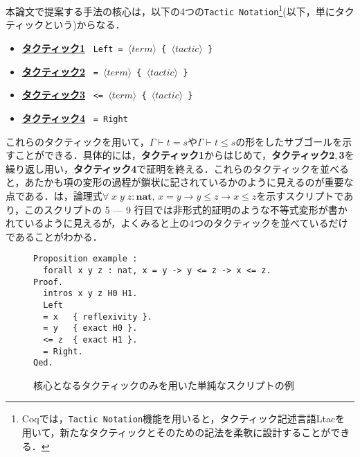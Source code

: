 \documentclass[submit]{ipsj}
\begin{document}
本論文で提案する手法の核心は，以下の4つの\verb+Tactic Notation+\footnote{Coqでは，\texttt{Tactic Notation}機能を用いると，タクティック記述言語Ltacを用いて，新たなタクティックとそのための記法を柔軟に設計することができる．}(以下，単にタクティックという)からなる．
\begin{itemize}
\item \underline{\gtfamily\bfseries タクティック1} ~\verb+Left = +$\langle\mathit{term}\rangle$\verb+ { +$\langle\mathit{tactic}\rangle$\verb+ }+
\item \underline{\gtfamily\bfseries タクティック2} ~\verb+= +$\langle\mathit{term}\rangle$\verb+ { +$\langle\mathit{tactic}\rangle$\verb+ }+
\item \underline{\gtfamily\bfseries タクティック3} ~\verb+<= +$\langle\mathit{term}\rangle$\verb+ { +$\langle\mathit{tactic}\rangle$\verb+ }+
\item \underline{\gtfamily\bfseries タクティック4} ~\verb+= Right+
\end{itemize}
これらのタクティックを用いて，$\Gamma \vdash t = s$や$\Gamma \vdash t \leq s$の形をしたサブゴールを示すことができる．具体的には，{\gtfamily\bfseries タクティック1}からはじめて，{\gtfamily\bfseries タクティック2},\,{\gtfamily\bfseries 3}を繰り返し用い，{\gtfamily\bfseries タクティック4}で証明を終える．これらのタクティックを並べると，あたかも項の変形の過程が鎖状に記されているかのように見えるのが重要な点である．は，論理式$\forall \;x\;y\;z : \mathbf{nat}, \, x = y \to y \leq z \to x \leq z$を示すスクリプトであり，このスクリプトの 5 --- 9 行目では非形式的証明のような不等式変形が書かれているように見えるが，よくみると上の4つのタクティックを並べているだけであることがわかる．
\begin{figure}[t]
\begin{mdframed}
\begin{verbatim}
Proposition example :
  forall x y z : nat, x = y -> y <= z -> x <= z.
Proof.
  intros x y z H0 H1.
  Left
  = x   { reflexivity }.
  = y   { exact H0 }.
  <= z  { exact H1 }.
  = Right.
Qed.
\end{verbatim}
\end{mdframed}
\caption{核心となるタクティックのみを用いた単純なスクリプトの例}
\label{fig:ex_proof_easy_prop}
\end{figure}
\end{document}
